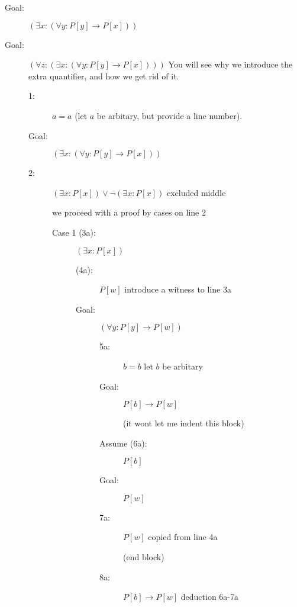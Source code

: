 \documentclass[12pt]{book}
\begin{document}
\begin{description}
\begin{description}

 \item[Goal:]  $(\exists x:(\forall y:P[y] \rightarrow P[x]))$

\item[Goal:] $(\forall z:(\exists x:(\forall y:P[y] \rightarrow P[x])))$  You will see why we introduce the extra quantifier, and how we get rid of it.

\begin{description}

\item[1:]  $a=a$ (let $a$ be arbitary, but provide a line number).

\item[Goal:]  $(\exists x:(\forall y:P[y] \rightarrow P[x]))$

\item[2:]  $(\exists x:P[x]) \vee \neg (\exists x:P[x])$  excluded middle

we proceed with a proof by cases on line 2

\begin{description}

\item[Case 1 (3a):]  $(\exists x:P[x])$

\begin{description}

\item[(4a):]  $P[w]$  introduce a witness to line 3a

\item[Goal:]  $(\forall y:P[y] \rightarrow P[w])$

\begin{description}

\item[5a:]  $b=b$ let $b$ be arbitary

\item[Goal:]  $P[b] \rightarrow P[w]$

(it wont let me indent this block)

\item[Assume (6a):]   $P[b]$

\item[Goal:]  $P[w]$

\item[7a:]  $P[w]$ copied from line 4a

(end block)

\item[8a:]  $P[b] \rightarrow P[w]$ deduction 6a-7a


\end{description}
\end{description}
\end{description}
\end{description}
\end{description}
\end{description}
\end{document}
